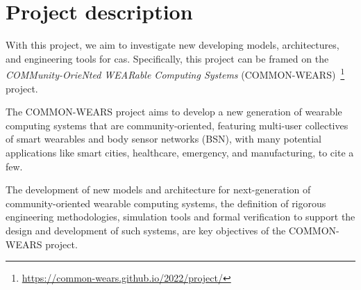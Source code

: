 \documentclass[12pt,a4paper]{article}
\newcommand{\meta}[1]{{\color{blue}#1}}
\begin{document}
\section{Project description}\label{sec:project-description}
\meta{
With this project,
we aim to investigate new developing models,
architectures,
and engineering tools for \ac{cas}.
%
Specifically,
this project can be framed on the \emph{COMMunity-OrieNted WEARable Computing Systems} (COMMON-WEARS)~\footnote{\url{https://common-wears.github.io/2022/project/}} project.

The COMMON-WEARS project aims to develop a new generation of wearable computing systems that are community-oriented,
featuring multi-user collectives of smart wearables and body sensor networks (BSN),
with many potential applications like smart cities,
healthcare,
emergency,
and manufacturing, to cite a few.

The development of new models and architecture for next-generation of community-oriented wearable computing systems,
the definition of rigorous engineering methodologies,
simulation tools and formal verification to support the design and development of such systems,
are key objectives of the COMMON-WEARS project.

	
}
\end{document}
